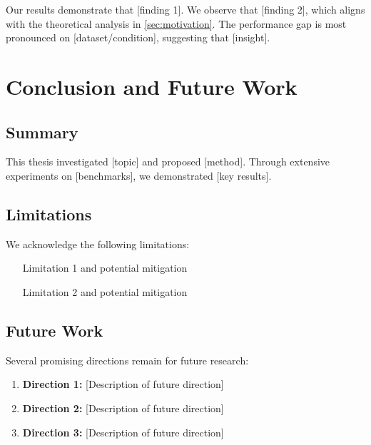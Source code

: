 \documentclass[12pt,a4paper,oneside]{book}
\theoremstyle{plain}
\theoremstyle{definition}
\theoremstyle{remark}
\begin{document}
Our results demonstrate that [finding 1]. We observe that [finding 2], which aligns with the theoretical analysis in \cref{sec:motivation}. The performance gap is most pronounced on [dataset/condition], suggesting that [insight].

\chapter{Conclusion and Future Work}
\label{ch:conclusion}

\section{Summary}

This thesis investigated [topic] and proposed [method]. Through extensive experiments on [benchmarks], we demonstrated [key results].

\section{Limitations}

We acknowledge the following limitations:
\begin{itemize}[itemsep=0.3em]
    \item [Limitation 1 and potential mitigation]
    \item [Limitation 2 and potential mitigation]
\end{itemize}

\section{Future Work}

Several promising directions remain for future research:
\begin{enumerate}[itemsep=0.3em]
    \item \textbf{Direction 1:} [Description of future direction]
    \item \textbf{Direction 2:} [Description of future direction]
    \item \textbf{Direction 3:} [Description of future direction]
\end{enumerate}

\backmatter

% 
% 
\end{document}
